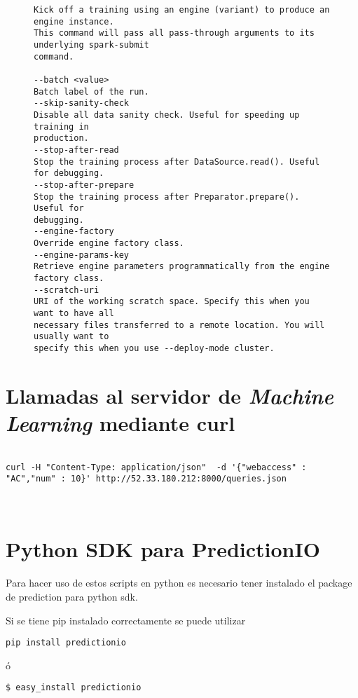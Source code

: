 \begin{figure}[t]
\begin{lstlisting}[frame=single,basicstyle=\ttfamily\tiny,]
Kick off a training using an engine (variant) to produce an engine instance.
This command will pass all pass-through arguments to its underlying spark-submit
command.

--batch <value>
Batch label of the run.
--skip-sanity-check
Disable all data sanity check. Useful for speeding up training in
production.
--stop-after-read
Stop the training process after DataSource.read(). Useful for debugging.
--stop-after-prepare
Stop the training process after Preparator.prepare(). Useful for
debugging.
--engine-factory
Override engine factory class.
--engine-params-key
Retrieve engine parameters programmatically from the engine factory class.
--scratch-uri
URI of the working scratch space. Specify this when you want to have all
necessary files transferred to a remote location. You will usually want to
specify this when you use --deploy-mode cluster.

\end{lstlisting}
	
	
	

\end{figure}


\vspace{1cm}


\section {Llamadas al servidor de \emph{Machine Learning} mediante curl }


\begin{lstlisting}

curl -H "Content-Type: application/json"  -d '{"webaccess" : "AC","num" : 10}' http://52.33.180.212:8000/queries.json



\end{lstlisting}



\section{Python SDK para PredictionIO}

Para hacer uso de estos scripts en python es necesario tener instalado el package de prediction para python sdk.

Si se tiene pip instalado correctamente se puede utilizar

\begin{verbatim}
pip install predictionio
\end{verbatim}
ó
\begin{verbatim}
$ easy_install predictionio
\end{verbatim}



